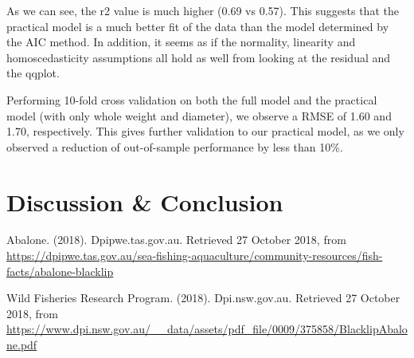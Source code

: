 \documentclass[10pt,twocolumn]{article}
\begin{document}
		As we can see, the r2 value is much higher (0.69 vs 0.57). This suggests that the practical model is a much better fit of the data than the model determined by the AIC method. In addition, it seems as if the normality, linearity and homoscedasticity assumptions all hold as well from looking at the residual and the qqplot.
		
		Performing 10-fold cross validation on both the full model and the practical model (with only whole weight and diameter), we observe a RMSE of 1.60 and 1.70, respectively. This gives further validation to our practical model, as we only observed a reduction of out-of-sample performance by less than 10\%. 
	
	\section{Discussion \& Conclusion}
	
		
	
	\begin{thebibliography}{9}
		Abalone. (2018). Dpipwe.tas.gov.au. Retrieved 27 October 2018, from \url{https://dpipwe.tas.gov.au/sea-fishing-aquaculture/community-resources/fish-facts/abalone-blacklip}
		
		Wild Fisheries Research Program. (2018). Dpi.nsw.gov.au. Retrieved 27 October 2018, from		\url{https://www.dpi.nsw.gov.au/__data/assets/pdf_file/0009/375858/BlacklipAbalone.pdf}
	\end{thebibliography}
\end{document}
